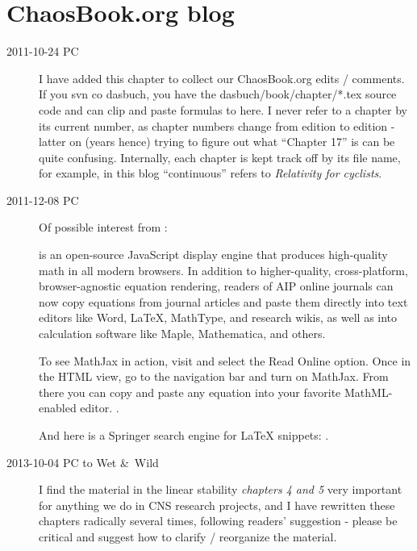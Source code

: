 
\chapter{ChaosBook.org blog}
\label{chap:ChaosBook}

\renewcommand{\ssp}{x}

\begin{description}

\item[2011-10-24 PC]
I have added this chapter to collect our ChaosBook.org edits /
comments. If you svn co dasbuch, you have the dasbuch/book/chapter/*.tex
source code and can clip and paste formulas to here. I never refer to a
chapter by its current number, as chapter numbers change from edition to
edition - latter on (years hence) trying to figure out what ``Chapter
17'' is can be quite confusing. Internally, each chapter is kept track
off by its file name, for example, in this blog ``continuous'' refers to
 {\em Relativity for cyclists}.

\item[2011-12-08 PC] Of possible interest from
:

 is an open-source JavaScript
display engine that produces high-quality math in all modern browsers. In
addition to higher-quality, cross-platform, browser-agnostic equation
rendering, readers of AIP online journals can now copy equations from
journal articles and paste them directly into text editors like Word,
LaTeX, MathType, and research wikis, as well as into calculation software
like Maple, Mathematica, and others.

To see MathJax in action, visit
 and select the Read Online option. Once in the
HTML view, go to the navigation bar and turn on MathJax. From there you
can copy and paste any equation into your favorite MathML-enabled editor.
.

And here is a Springer search engine for LaTeX snippets:
.


\item[2013-10-04 PC to Wet \&\ Wild]                      \toCB
I find the material in the linear stability \emph{chapters 4 and 5}
very important for anything we do in CNS research projects, and I
have rewritten these chapters radically several times, following
readers' suggestion - please be critical and suggest how to clarify /
reorganize the material.


\end{description}
